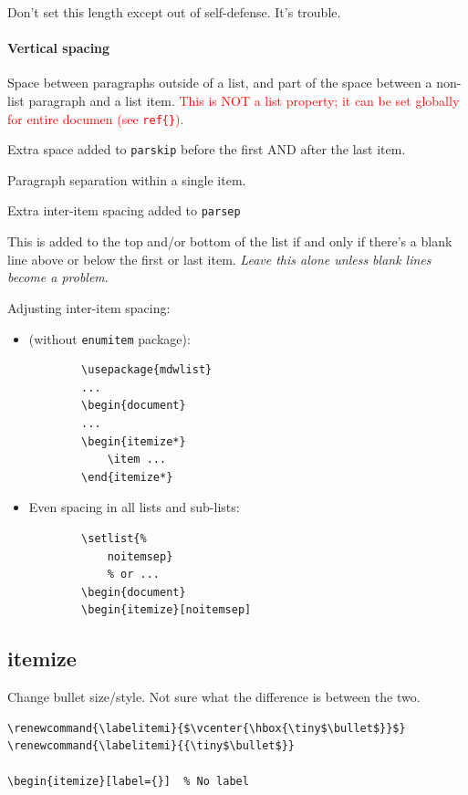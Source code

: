 \documentclass{article}
\renewcommand{\labelitemi}{$\vcenter{\hbox{\tiny$\bullet$}}$}
\begin{document}
\begin{description}[labelindent=2cm, leftmargin=\labelindent,
        ]
        Don't set this length except out of self-defense. It's trouble.
\end{description}
\paragraph{Vertical spacing}
\begin{description}[labelindent=2cm, leftmargin=\labelindent]
    \item [parskip] Space between paragraphs outside of a list, and part of
        the space between a non-list paragraph and a list item.
        \textcolor{red}{This is NOT a list property; it can be set
        globally for entire documen (see \SS{} \texttt{ref\{\}}).}
    \item [topsep] Extra space added to \texttt{parskip} before the first
        AND after the last item.
    \item [parsep] Paragraph separation within a single item.
    \item [itemsep] Extra inter-item spacing added to \texttt{parsep}
    \item [partopsep] This is added to the top and/or bottom of the list
        if and only if there's a blank line above or below the first
        or last item. \emph{Leave this alone unless blank lines become a
        problem}.
\end{description}
Adjusting inter-item spacing:
\begin{itemize}
    \item (without \texttt{enumitem} package):
        \begin{lstlisting}
        \usepackage{mdwlist}
        ...
        \begin{document}
        ...
        \begin{itemize*}
            \item ...
        \end{itemize*}
        \end{lstlisting}
    \item Even spacing in all lists and sub-lists:
        \begin{lstlisting}
        \setlist{%
            noitemsep}
            % or ...
        \begin{document}
        \begin{itemize}[noitemsep]
        \end{lstlisting}
\end{itemize}

\subsection{itemize}
Change bullet size/style. Not sure what the difference is between the two.
\begin{lstlisting}
\renewcommand{\labelitemi}{$\vcenter{\hbox{\tiny$\bullet$}}$}
\renewcommand{\labelitemi}{{\tiny$\bullet$}}

\begin{itemize}[label={}]  % No label
\end{lstlisting}
\end{document}
